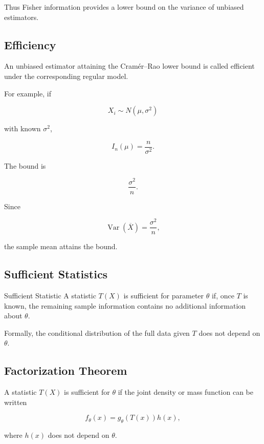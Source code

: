 Thus Fisher information provides a lower bound on the variance of
unbiased estimators.

\subsection{Efficiency}
\label{subsec:estimator-efficiency}

An unbiased estimator attaining the Cramér--Rao lower bound is called
efficient under the corresponding regular model.

For example, if

\[
X_i
\sim
N(\mu,\sigma^2)
\]

with known \(\sigma^2\),

\[
I_n(\mu)
=
\frac{n}{\sigma^2}.
\]

The bound is

\[
\frac{\sigma^2}{n}.
\]

Since

\[
\operatorname{Var}(\overline{X})
=
\frac{\sigma^2}{n},
\]

the sample mean attains the bound.

\subsection{Sufficient Statistics}
\label{subsec:sufficient-statistics}

\begin{definitionbox}{Sufficient Statistic}
A statistic \(T(X)\) is sufficient for parameter \(\theta\) if, once
\(T\) is known, the remaining sample information contains no additional
information about \(\theta\).
\end{definitionbox}

Formally, the conditional distribution of the full data given \(T\) does
not depend on \(\theta\).

\subsection{Factorization Theorem}
\label{subsec:factorization-theorem}

\begin{theorem}
A statistic \(T(X)\) is sufficient for \(\theta\) if the joint density or
mass function can be written

\[
\boxed{
f_\theta(x)
=
g_\theta
(
T(x)
)
h(x),
}
\]

where \(h(x)\) does not depend on \(\theta\).
\end{theorem}

